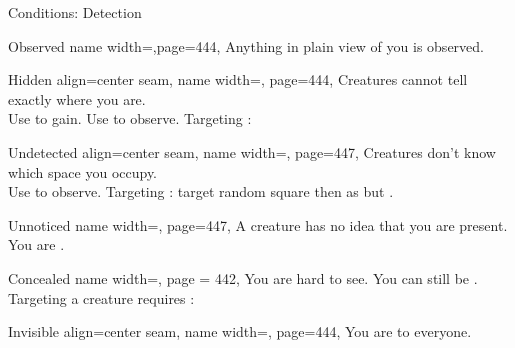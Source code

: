 \begin{PageFront}
\begin{Tables}{\frontTableHeight}
\begin{Table}{Conditions: Detection}
            \begin{entry}{Observed}{%
                name width=\conditionLength,page=444,}
                Anything in plain view of you is observed.
            \end{entry}
            \begin{entry}{Hidden}{%
                align=center seam,
                name width=\conditionLength,%
                page=444,
            }%
                Creatures cannot tell exactly where you are. \hfill
                \\
                Use  to gain. Use  to observe. \hfill
                Targeting \Hidden\hspace{0.1ex}: \Flat[][val=11] 
            \end{entry}
            \begin{entry}{Undetected}{%
                align=center seam,
                name width=\conditionLength,%
                page=447,
            }
                Creatures don't know which space you occupy. \hfill {}\\
                Use  to observe.\hfill
                Targeting \Undetected: target random square then as \Hidden but \Se.
            \end{entry}
            \begin{entry}{Unnoticed}{%
                name width=\conditionLength,%
                page=447,
            }
                A creature has no idea that you are present. You are \Undetected.
            \end{entry}
            \breakLine
            \begin{entry}{Concealed}{%
                name width=\conditionLength,%
                page = 442,
            }
                You are hard to see. You can still be \Observed. \hfill
                Targeting a \Concealed creature requires : \Flat[][val=5] 
            \end{entry}
            \begin{entry}{Invisible}{%
                align=center seam,
                name width=\conditionLength,%
                page=444,
            }
                You are \Undetected to everyone. \hfill
                 \\

\end{entry}
\end{Table}
\end{Tables}
\end{PageFront}
